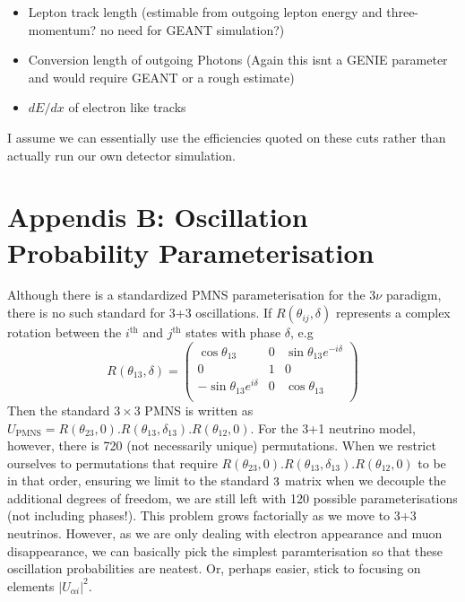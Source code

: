\documentclass[12pt, a4paper]{article}
\begin{document}
\begin{itemize}
	\item Lepton track length (estimable from outgoing lepton energy and three-momentum? no need for GEANT simulation?)
	\item Conversion length of outgoing Photons (Again this isnt a GENIE parameter and would require GEANT or a rough estimate)
	\item $dE/dx$ of electron like tracks
\end{itemize}
I assume we can essentially use the efficiencies quoted on these cuts rather than actually run our own detector simulation. 

\section{Appendis B: Oscillation Probability Parameterisation}
Although there is a standardized PMNS parameterisation for the 3$\nu$ paradigm, there is no such standard for 3+3 oscillations. If $R(\theta_{ij},\delta)$ represents a complex rotation between the $i^\text{th}$ and $j^\text{th}$ states with phase $\delta$, e.g
\begin{equation*}
	R(\theta_{13},\delta)  = 
	\begin{pmatrix} 
		\cos \theta_{13} & 0 & \sin \theta_{13} e^{-i \delta} \\
		0 & 1 & 0 \\
		-\sin \theta_{13} e^{i \delta} & 0 & \cos \theta_{13} \\
	\end{pmatrix}
\end{equation*}
Then the standard $3\times3$ PMNS is written as $U_\text{PMNS}= R(\theta_{23},0).R(\theta_{13},\delta_{13}).R(\theta_{12},0)$. For the 3+1 neutrino model, however, there is 720 (not necessarily unique) permutations. When we restrict ourselves to permutations that require  $R(\theta_{23},0).R(\theta_{13},\delta_{13}).R(\theta_{12},0)$ to be in that order, ensuring we limit to the standard $3\time3$ matrix when we decouple the additional degrees of freedom, we are still left with 120 possible parameterisations (not including phases!). This problem grows factorially as we move to 3+3 neutrinos. However, as we are only dealing with electron appearance and muon disappearance, we can basically pick the simplest paramterisation so that these oscillation probabilities are neatest. Or, perhaps easier, stick to focusing on elements $\vert U_{\alpha i}\vert^2$.  
\end{document}
